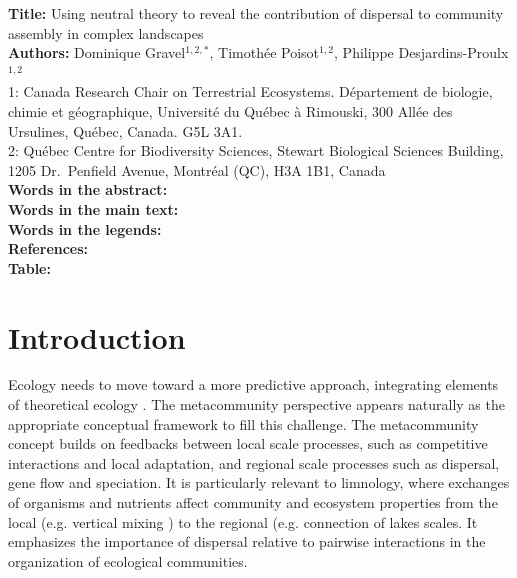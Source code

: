 \documentclass[12pt]{article}
\begin{document}
\linenumbers 
\modulolinenumbers[1]

\textbf{Title:}  Using neutral theory to reveal the contribution of dispersal to community assembly in complex landscapes\\

\textbf{Authors:}  Dominique Gravel$^{1,2,*}$, Timoth\'ee Poisot$^{1,2}$, Philippe Desjardins-Proulx$^{1,2}$\\

1: Canada Research Chair on Terrestrial Ecosystems. D\'epartement de biologie, chimie et g\'eographique, Universit\'e du Qu\'ebec \`a Rimouski, 300 All\'ee des Ursulines, Qu\'ebec, Canada. G5L 3A1.\\

2: Qu\'ebec Centre for Biodiversity Sciences, Stewart Biological Sciences Building, 1205 Dr.~Penfield Avenue, Montr\'eal (QC), H3A 1B1, Canada\\

\textbf{Words in the abstract:}      \\
\textbf{Words in the main text:}    \\
\textbf{Words in the legends:}    \\
\textbf{References:}             \\
\textbf{Table:}                    \\

\newpage
\doublespacing

\section{Introduction}

Ecology needs to move toward a more predictive approach, integrating elements of
theoretical ecology \parencite{Thuiller2013}. The metacommunity perspective \parencite{Leibold2004a}
appears naturally as the appropriate conceptual framework to fill this
challenge. The metacommunity concept builds on feedbacks between local scale
processes, such as competitive interactions and local adaptation, and regional
scale processes such as dispersal, gene flow and speciation. It is particularly relevant to limnology,
where exchanges of organisms and nutrients affect community and ecosystem
properties from the local (e.g. vertical mixing \parencite{Ryabov2011}) to the
regional (e.g. connection of lakes \parencite{Leibold2004b, Gravel2010} scales.
It emphasizes the importance of dispersal relative to pairwise interactions in
the organization of ecological communities.
\end{document}
